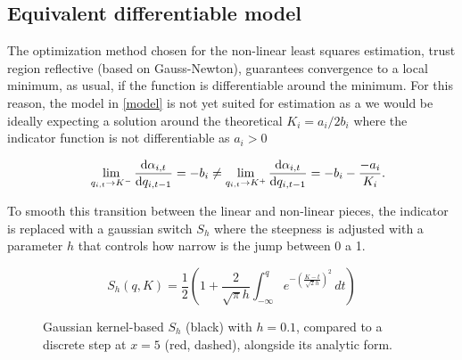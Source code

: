 \documentclass[12pt]{article}
\begin{document}
\subsection{Equivalent differentiable model}
The optimization method chosen for the non-linear least squares estimation, trust region reflective (based on Gauss-Newton), guarantees convergence to a local minimum, as usual, if the function is differentiable around the minimum. For this reason, the model in \ref{model} is not yet suited for estimation as a we would be ideally expecting a solution around the theoretical $K_i=a_i/2b_i$ where the indicator function is not differentiable as $a_i>0$

$$
    \quad \lim_{q_{i,t}\to K^-} \odv{\alpha_{i,t}}{q_{i,t-1}}=-b_i \neq  \lim_{q_{i,t}\to K^+} \odv{\alpha_{i,t}}{q_{i,t-1}}=-b_i-\frac{-a_i}{K_i}.
$$


To smooth this transition between the linear and non-linear pieces, the indicator is replaced with a gaussian switch $S_h$ where the steepness is adjusted with a parameter $h$ that controls how narrow is the jump between 0 a 1. 
\begin{figure}[H]
  \centering
  \begin{minipage}{0.45\linewidth}
    \centering
  \end{minipage}%
  \hfill
  \begin{minipage}{0.5\linewidth}
    \centering
    \[
    S_h(q, K) =
    \frac12\left(
      1 + \frac{2}{\sqrt{\pi}h}
      \int_{-\infty}^{q} e^{-\left(\frac{K-t}{\sqrt{2}h}\right)^2} \, dt
    \right)
    \]
  \end{minipage}

  \caption{Gaussian kernel-based \(S_h\) (black) with \(h=0.1\), compared to a discrete step at \(x=5\) (red, dashed), alongside its analytic form.}
  \label{fig:gaussian-cdf-vs-step}
\end{figure}
\end{document}
